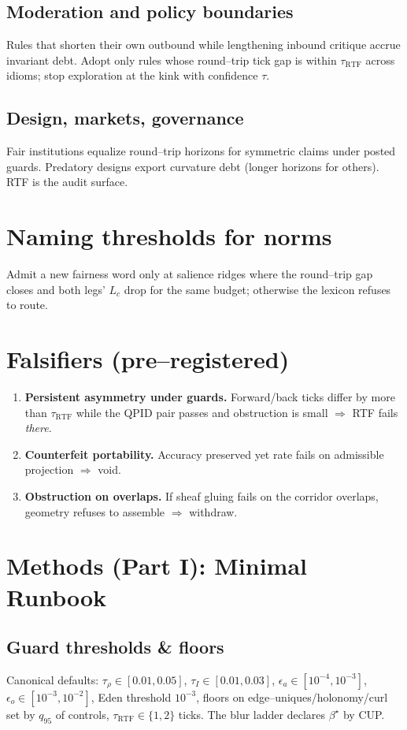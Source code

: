 \documentclass[11pt]{article}
\begin{document}
\subsection{Moderation and policy boundaries}
Rules that shorten their own outbound while lengthening inbound critique accrue invariant debt. Adopt only rules whose round--trip tick gap is within $\tau_{\text{RTF}}$ across idioms; stop exploration at the kink with confidence $\tau$.

\subsection{Design, markets, governance}
Fair institutions equalize round--trip horizons for symmetric claims under posted guards. Predatory designs export curvature debt (longer horizons for others). RTF is the audit surface.

\section{Naming thresholds for norms}
Admit a new fairness word only at salience ridges where the round--trip gap closes and both legs' $L_c$ drop for the same budget; otherwise the lexicon refuses to route.

\section{Falsifiers (pre--registered)}
\begin{enumerate}[leftmargin=1.3em]
\item \textbf{Persistent asymmetry under guards.} Forward/back ticks differ by more than $\tau_{\text{RTF}}$ while the QPID pair passes and obstruction is small $\Rightarrow$ RTF fails \emph{there}.
\item \textbf{Counterfeit portability.} Accuracy preserved yet rate fails on admissible projection $\Rightarrow$ void.
\item \textbf{Obstruction on overlaps.} If sheaf gluing fails on the corridor overlaps, geometry refuses to assemble $\Rightarrow$ withdraw.
\end{enumerate}

\section{Methods (Part I): Minimal Runbook}
\subsection{Guard thresholds \& floors}
Canonical defaults: $\tau_\rho\in[0.01,0.05]$, $\tau_I\in[0.01,0.03]$, $\epsilon_a\in[10^{-4},10^{-3}]$, $\epsilon_o\in[10^{-3},10^{-2}]$, Eden threshold $10^{-3}$, floors on edge--uniques/holonomy/curl set by $q_{95}$ of controls, $\tau_{\text{RTF}}\in\{1,2\}$ ticks. The blur ladder declares $\beta^\star$ by CUP.
\end{document}
